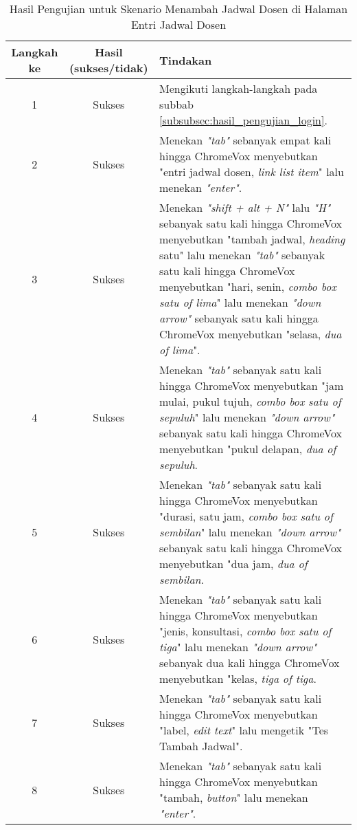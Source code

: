 \begin{table}[H]
    \centering 
    \caption{Hasil Pengujian untuk Skenario Menambah Jadwal Dosen di Halaman Entri Jadwal Dosen}
    \label{tab:hasil_pengujian_menambah_jadwal_dosen_di_halaman_entri_jadwal_dosen}
    \begin{tabular}{|c|c|p{10cm}|}
        \toprule
        Langkah ke & Hasil (sukses/tidak) & Tindakan \\

        \midrule
        1 & Sukses & Mengikuti langkah-langkah pada subbab \ref{subsubsec:hasil_pengujian_login}. \\
        2 & Sukses & Menekan \textit{"tab"} sebanyak empat kali hingga ChromeVox menyebutkan "entri jadwal dosen, \textit{link list item}" lalu menekan \textit{"enter"}. \\
        3 & Sukses & Menekan \textit{"shift + alt + N"} lalu \textit{"H"} sebanyak satu kali hingga ChromeVox menyebutkan "tambah jadwal, \textit{heading} satu" lalu menekan \textit{"tab"} sebanyak satu kali hingga ChromeVox menyebutkan "hari, senin, \textit{combo box satu of lima}" lalu menekan \textit{"down arrow"} sebanyak satu kali hingga ChromeVox menyebutkan "selasa, \textit{dua of lima}". \\
        4 & Sukses & Menekan \textit{"tab"} sebanyak satu kali hingga ChromeVox menyebutkan "jam mulai, pukul tujuh, \textit{combo box satu of sepuluh}" lalu menekan \textit{"down arrow"} sebanyak satu kali hingga ChromeVox menyebutkan "pukul delapan, \textit{dua of sepuluh}. \\ 
        5 & Sukses & Menekan \textit{"tab"} sebanyak satu kali hingga ChromeVox menyebutkan "durasi, satu jam, \textit{combo box satu of sembilan}" lalu menekan \textit{"down arrow"} sebanyak satu kali hingga ChromeVox menyebutkan "dua jam, \textit{dua of sembilan}. \\ 
        6 & Sukses & Menekan \textit{"tab"} sebanyak satu kali hingga ChromeVox menyebutkan "jenis, konsultasi, \textit{combo box satu of tiga}" lalu menekan \textit{"down arrow"} sebanyak dua kali hingga ChromeVox menyebutkan "kelas, \textit{tiga of tiga}. \\ 
        7 & Sukses & Menekan \textit{"tab"} sebanyak satu kali hingga ChromeVox menyebutkan "label, \textit{edit text}" lalu mengetik "Tes Tambah Jadwal". \\ 
        8 & Sukses & Menekan \textit{"tab"} sebanyak satu kali hingga ChromeVox menyebutkan "tambah, \textit{button}" lalu menekan \textit{"enter"}. \\ 

        \bottomrule

    \end{tabular}
\end{table}

